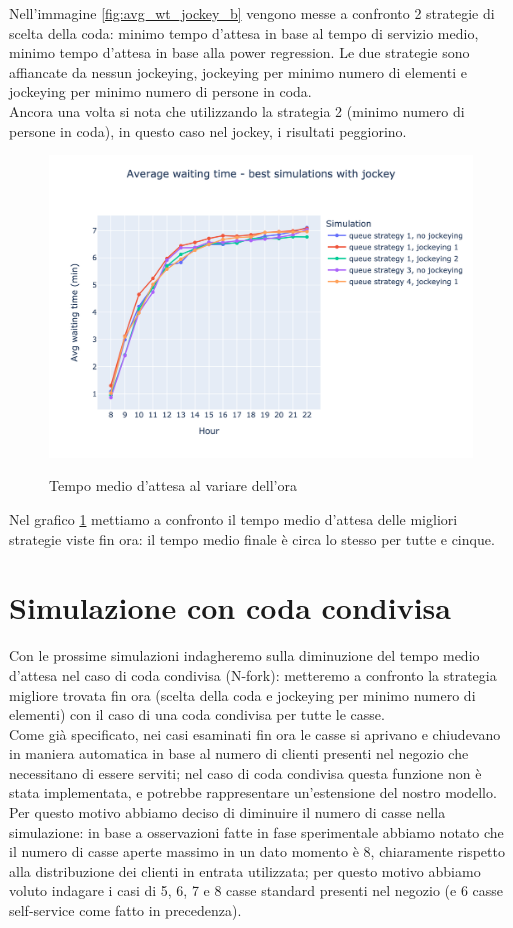 Nell'immagine \ref{fig:avg_wt_jockey_b} vengono messe a confronto 2 strategie di scelta della coda: minimo tempo d'attesa in base al tempo di servizio medio, minimo tempo d'attesa in base alla power regression. Le due strategie sono affiancate da nessun jockeying, jockeying per minimo numero di elementi e jockeying per minimo numero di persone in coda. \\
Ancora una volta si nota che utilizzando la strategia 2 (minimo numero
di persone in coda), in questo caso nel jockey, i risultati
peggiorino.

\begin{figure}[H]
	\centering
	\includegraphics[width=12cm]{"images/results/avg_wt_jockey_best.png"}
	\label{fig:avg_wt_jockey_best}
	\caption{Tempo medio d'attesa al variare dell'ora}
\end{figure}

Nel grafico \ref{fig:avg_wt_jockey_best} mettiamo a confronto il tempo medio d'attesa delle migliori strategie viste fin ora: il tempo medio finale è circa lo stesso per tutte e cinque.

\section{Simulazione con coda condivisa}

Con le prossime simulazioni indagheremo sulla diminuzione del tempo medio d'attesa nel caso di coda condivisa (N-fork): metteremo a confronto la strategia migliore trovata fin ora (scelta della coda e jockeying per minimo numero di elementi) con il caso di una coda condivisa per tutte le casse. \\
Come già specificato, nei casi esaminati fin ora le casse si aprivano
e chiudevano in maniera automatica in base al numero di clienti
presenti nel negozio che necessitano di essere serviti; nel caso di
coda condivisa questa funzione non è stata implementata, e potrebbe
rappresentare un'estensione del nostro modello. Per questo motivo
abbiamo deciso di diminuire il numero di casse nella simulazione: in
base a osservazioni fatte in fase sperimentale abbiamo notato che il
numero di casse aperte massimo in un dato momento è 8, chiaramente
rispetto alla distribuzione dei clienti in entrata utilizzata; per
questo motivo abbiamo voluto indagare i casi di 5, 6, 7 e 8 casse
standard presenti nel negozio (e 6 casse self-service come fatto in
precedenza).

